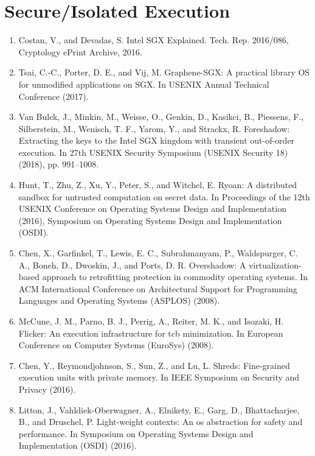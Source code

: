 \section{Secure/Isolated Execution}

\begin{enumerate}[resume]
\item Costan, V., and Devadas, S. Intel SGX Explained. Tech. Rep. 2016/086, Cryptology ePrint Archive, 2016.
\item  Tsai, C.-C., Porter, D. E., and Vij, M. Graphene-SGX: A practical library OS for unmodified applications on SGX. In USENIX Annual Technical Conference (2017).
\item Van Bulck, J., Minkin, M., Weisse, O., Genkin, D., Kasikci, B., Piessens, F., Silberstein, M., Wenisch, T. F., Yarom, Y., and Strackx, R. Foreshadow: Extracting the keys to the Intel SGX kingdom with transient out-of-order execution. In 27th USENIX Security Symposium (USENIX Security 18) (2018), pp. 991–1008.
\item Hunt, T., Zhu, Z., Xu, Y., Peter, S., and Witchel, E. Ryoan: A distributed sandbox for untrusted computation on secret data. In Proceedings of the 12th USENIX Conference on Operating Systems Design and Implementation (2016), Symposium on Operating Systems Design and Implementation (OSDI).
\item Chen, X., Garfinkel, T., Lewis, E. C., Subrahmanyam, P., Waldspurger, C. A., Boneh, D., Dwoskin, J., and Ports, D. R. Overshadow: A virtualization-based approach to retrofitting protection in commodity operating systems. In ACM International Conference on Architectural Support for Programming Languages and Operating Systems (ASPLOS) (2008).
\item McCune, J. M., Parno, B. J., Perrig, A., Reiter, M. K., and Isozaki, H. Flicker: An execution infrastructure for tcb minimization. In European Conference on Computer Systems (EuroSys) (2008).
\item  Chen, Y., Reymondjohnson, S., Sun, Z., and Lu, L. Shreds: Fine-grained execution units with private memory. In IEEE Symposium on Security and Privacy (2016).
\item  Litton, J., Vahldiek-Oberwagner, A., Elnikety, E., Garg, D., Bhattacharjee, B., and Druschel, P. Light-weight contexts: An os abstraction for safety and performance. In Symposium on Operating Systems Design and Implementation (OSDI) (2016).
\end{enumerate}

